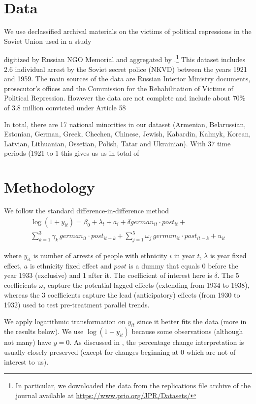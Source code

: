 \documentclass[11pt]{article}
\begin{document}
\section{Data}
We use declassified archival materials on the victims of political repressions in the Soviet Union used in a study \citet{zhukov_stalins_2018}

digitized by Russian NGO Memorial and aggregated by .\footnote{In particular, we downloaded the data from the replications file archive of the journal available  at \url{https://www.prio.org/JPR/Datasets/}} This dataset includes 2.6 individual arrest by the Soviet secret police (NKVD) between  the years 1921 and 1959. 
The main sources of the data are Russian Interior Ministry documents, prosecutor’s offices and the Commission for the Rehabilitation of Victims of Political Repression. However the data are not complete and include about 70\% of 3.8 million convicted under Article 58

In total, there are 17 national minorities in our dataset (Armenian, Belarussian, Estonian, German, Greek, Chechen, Chinese, Jewish, Kabardin, Kalmyk, Korean, Latvian, Lithuanian, Ossetian, Polish, Tatar and Ukrainian). With 37 time periods (1921 to 1 this gives us us in total of 


\section{Methodology}
We follow the standard difference-in-difference method
\begin{multline}
 \log\left(1 + y_{it}\right) = \beta_0 +\lambda_t + a_i  + \delta german_{it} \cdot post_{it} + \\ \sum_{k= 1}^3 \gamma_k \, german_{it} \cdot post_{it+ k} + \sum_{j= 1}^5 \omega_j \, german_{it} \cdot post_{it - k}  + u_{it}   
\end{multline}

where $y_{it}$ is number of arrests of people with ethnicity $i$ in year $t$, $\lambda$ is year fixed effect, $a$ is ethnicity fixed effect and $post$ is a dummy that equals 0 before the year 1933 (exclusive) and 1 after it. The coefficient of interest here is $\delta$. The 5 coefficients $\omega_j$ capture the potential lagged effects (extending from 1934 to 1938), whereas the 3 coefficients capture the lead (anticipatory) effects (from 1930 to 1932) used to test pre-treatment parallel trends.  

 We apply logarithmic transformation on $y_{it}$ since it better fits the data (more in the results below).  We use $\log\left(1 + y_{it}\right)$ because some observations (although not many) have $y = 0$. As discussed in \citet[p. 193]{wooldridge_introductory_2015},  the percentage change interpretation is usually  closely preserved (except for changes beginning at 0 which are not of interest to us).   
\end{document}
